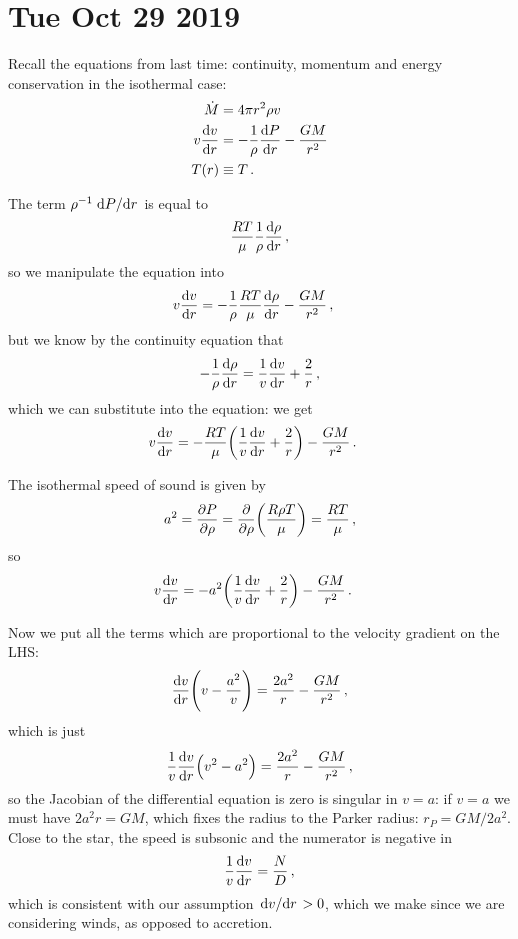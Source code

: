 \documentclass[main.tex]{subfiles}
\begin{document}
\section*{Tue Oct 29 2019}

Recall the equations from last time: continuity, momentum and energy conservation in the isothermal case:
%
\begin{subequations}
\begin{align}
  \dot{M}  &= 4 \pi r^2 \rho v  \\
  v \dv{v}{r} &= - \frac{1}{\rho } \dv{P}{r} - \frac{GM}{r^2} \\
  T(r) &\equiv T 
\,.
\end{align}
\end{subequations}

The term \(\rho^{-1} \dv*{P}{r} \) is equal to 
%
\begin{equation}
  \frac{RT}{\mu } \frac{1}{\rho } \dv{\rho }{r} 
\,,
\end{equation}
%
so we manipulate the equation into 
%
\begin{align}
  v \dv{v}{r}  &= - \frac{1}{\rho } \frac{RT}{\mu } \dv{\rho }{r} - \frac{GM}{r^2} 
\,,
\end{align}
%
but we know by the continuity equation that 
%
\begin{equation}
  - \frac{1}{\rho } \dv{\rho }{r} = \frac{1}{v} \dv{v}{r} + \frac{2}{r}     
\,,
\end{equation}
%
which we can substitute into the equation: we get
%
\begin{align}
    v \dv{v}{r}  &= - \frac{RT}{\mu } \qty(\frac{1}{v} \dv{v}{r} + \frac{2}{r}) - \frac{GM}{r^2} 
  \,.
\end{align}

The isothermal speed of sound is given by 
%
\begin{equation}
  a^2 = \pdv{P}{\rho } =\pdv{}{\rho } \qty(\frac{R \rho T}{\mu }) = \frac{RT }{\mu }
\,,
\end{equation}
%
so 
%
\begin{align}
    v \dv{v}{r}  &= - a^2 \qty(\frac{1}{v} \dv{v}{r} + \frac{2}{r}) - \frac{GM}{r^2} 
  \,.
\end{align}

Now we put all the terms which are proportional to the velocity gradient on the LHS: 
%
\begin{equation}
  \dv{v}{r} \qty(v - \frac{a^2}{v}) = \frac{2a^2 }{r }-\frac{GM}{r^2}
\,,
\end{equation}
%
which is just 
%
\begin{equation}
    \frac{1}{v}\dv{v}{r} \qty(v^2 - a^2) = \frac{2a^2 }{r }-\frac{GM}{r^2}
  \,,
\end{equation}
%
so the Jacobian of the differential equation is zero is singular in \(v=a\): if \(v=a\) we must have \(2a^2r = GM\), which fixes the radius to the Parker radius: \(r_P = GM / 2 a^2\).
Close to the star, the speed is subsonic and the numerator is negative in 
%
\begin{equation}
  \frac{1}{v} \dv{v}{r} = \frac{N}{D}
\,,
\end{equation}
%
which is consistent with our assumption \(\dv*{v}{r} > 0 \), which we make since we are considering winds, as opposed to accretion.
\end{document}
